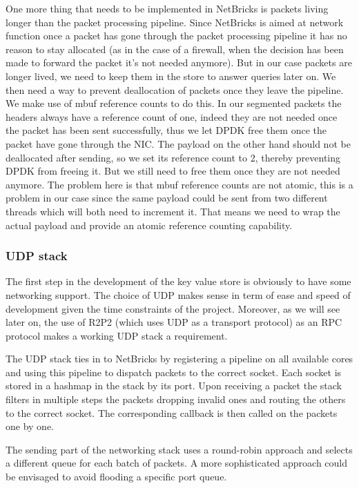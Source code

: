 \documentclass[11pt]{book}
\begin{document}
One more thing that needs to be implemented in NetBricks is packets
living longer than the packet processing pipeline. Since NetBricks is
aimed at network function once a packet has gone through the packet
processing pipeline it has no reason to stay allocated (as in the case
of a firewall, when the decision has been made to forward the packet
it's not needed anymore). But in our case packets are longer lived, we
need to keep them in the store to answer queries later on. We then
need a way to prevent deallocation of packets once they leave the
pipeline. We make use of mbuf reference counts to do this. In our
segmented packets the headers always have a reference count of one,
indeed they are not needed once the packet has been sent successfully,
thus we let DPDK free them once the packet have gone through the
NIC\@. The payload on the other hand should not be deallocated after
sending, so we set its reference count to 2, thereby preventing DPDK
from freeing it. But we still need to free them once they are not
needed anymore. The problem here is that mbuf reference counts are not
atomic, this is a problem in our case since the same payload could be
sent from two different threads which will both need to increment
it. That means we need to wrap the actual payload and provide an
atomic reference counting capability.

\subsubsection{UDP stack}
The first step in the development of the key value store is obviously
to have some networking support. The choice of UDP makes sense in term
of ease and speed of development given the time constraints of the
project. Moreover, as we will see later on, the use of R2P2 (which
uses UDP as a transport protocol) as an RPC protocol makes a
working UDP stack a requirement.

The UDP stack ties in to NetBricks by registering a pipeline on all
available cores and using this pipeline to dispatch packets to the
correct socket. Each socket is stored in a hashmap in the stack by its
port. Upon receiving a packet the stack filters in multiple steps the
packets dropping invalid ones and routing the others to the correct
socket. The corresponding callback is then called on the packets one
by one.

The sending part of the networking stack uses a round-robin approach
and selects a different queue for each batch of packets. A more
sophisticated approach could be envisaged to avoid flooding a specific
port queue.
\end{document}
